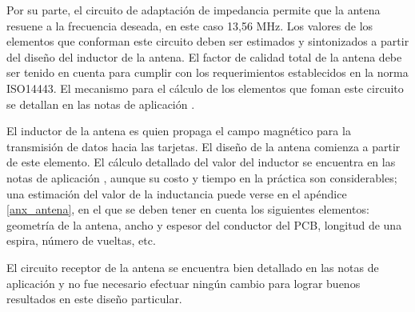 \bigskip
{}

Por su parte, el circuito de adaptación de impedancia permite que la antena resuene a la frecuencia deseada, en este caso 13,56 MHz. Los valores de los elementos que conforman este circuito deben ser estimados y sintonizados a partir del diseño del inductor de la antena.
El factor de calidad total de la antena debe ser tenido en cuenta para cumplir con los requerimientos establecidos en la norma ISO14443. 
El mecanismo para el cálculo de los elementos que foman este circuito se detallan en las notas de aplicación \cite{MRICF}.

\bigskip
{}

El inductor de la antena es quien propaga el campo magnético para la transmisión de datos hacia las tarjetas. El diseño de la antena comienza a partir de este elemento.
El cálculo detallado del valor del inductor se encuentra en las notas de aplicación \cite{ACD}, aunque su costo y tiempo en la práctica son considerables; una estimación del valor de la inductancia puede verse en el apéndice \ref{anx_antena}, en el que se deben tener en cuenta los siguientes elementos: geometría de la antena, ancho y espesor del conductor del PCB, longitud de una espira, número de vueltas, etc.

\bigskip
{} 

El circuito receptor de la antena se encuentra bien detallado en las notas de aplicación \cite{MRICF} y no fue necesario efectuar ningún cambio para lograr buenos resultados en este diseño particular. 